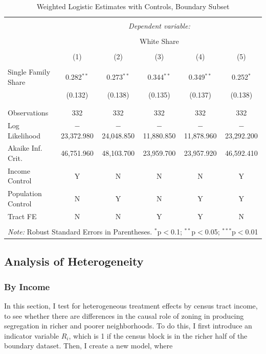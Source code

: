 \documentclass[11pt]{article}
\begin{document}
\begin{table}[!htbp] \centering 
  \caption{Weighted Logistic Estimates with Controls, Boundary Subset} 
  \label{tab:logit_controls_weighted} 
\begin{tabular}{@{\extracolsep{5pt}}lccccc} 
\\[-1.8ex]\hline 
\hline \\[-1.8ex] 
 & \multicolumn{5}{c}{\textit{Dependent variable:}} \\ 
\cline{2-6} 
\\[-1.8ex] & \multicolumn{5}{c}{White Share} \\ 
\\[-1.8ex] & (1) & (2) & (3) & (4) & (5)\\ 
\hline \\[-1.8ex] 
 Single Family Share & 0.282$^{**}$ & 0.273$^{**}$ & 0.344$^{**}$ & 0.349$^{**}$ & 0.252$^{*}$ \\ 
  & (0.132) & (0.138) & (0.135) & (0.137) & (0.138) \\ 
  & & & & & \\ 
\hline \\[-1.8ex] 
Observations & 332 & 332 & 332 & 332 & 332 \\ 
Log Likelihood & $-$23,372.980 & $-$24,048.850 & $-$11,880.850 & $-$11,878.960 & $-$23,292.200 \\ 
Akaike Inf. Crit. & 46,751.960 & 48,103.700 & 23,959.700 & 23,957.920 & 46,592.410 \\ 
\hline
Income Control & Y & N & N & N & Y\\
Population Control & N & Y & N & Y & Y\\
Tract FE & N & N & Y & Y & N\\
\hline 
\hline \\[-1.8ex] 
\multicolumn{6}{l}{\textit{Note:} Robust Standard Errors in Parentheses. $^{*}$p$<$0.1; $^{**}$p$<$0.05; $^{***}$p$<$0.01} \\
\end{tabular} 
\end{table}

\subsection{Analysis of Heterogeneity}

\subsubsection{By Income}

In this section, I test for heterogeneous treatment effects by census tract income, to see whether there are differences in the causal role of zoning in producing segregation in richer and poorer neighborhoods. To do this, I first introduce an indicator variable $R_i$, which is 1 if the census block is in the richer half of the boundary dataset. Then, I create a new model, where 
\end{document}
